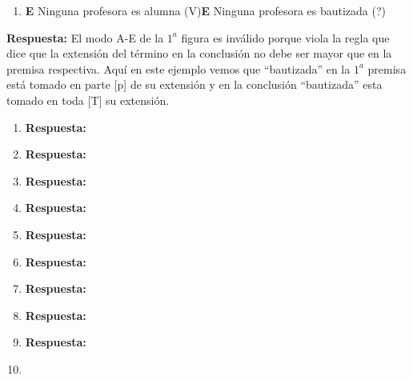 \documentclass{article}
\begin{document}
\begin{enumerate}[resume]
    \item  {}
    {\textbf{E} Ninguna profesora es alumna (V)}{\textbf{E} Ninguna profesora es bautizada (?)}
\end{enumerate}

\textbf{Respuesta:} El modo A-E de la $1^a$ figura es inválido porque viola la regla que dice que la extensión del término en la conclusión no debe ser mayor que en la premisa respectiva. Aquí en este ejemplo vemos que ``bautizada'' en la $1^a$ premisa está tomado en parte [p] de su extensión y en la conclusión ``bautizada'' esta tomado en toda [T] su extensión.

\begin{enumerate}[resume]
    \item {} 
    \textbf{Respuesta:}
    \\
    \item {} 
    \textbf{Respuesta:}
    \\
    \item {} 
    \textbf{Respuesta:}
    \\
    \item {} 
    \textbf{Respuesta:}
    \\
    \item {} 
    \textbf{Respuesta:}
    \\
    \item {} 
    \textbf{Respuesta:}
    \\
    \item {} 
    \textbf{Respuesta:}
    \\
    \item {} 
    \textbf{Respuesta:}
    \\
    \item {} 
    \textbf{Respuesta:}
    \\
    \item {} 

\end{enumerate}
\end{document}
